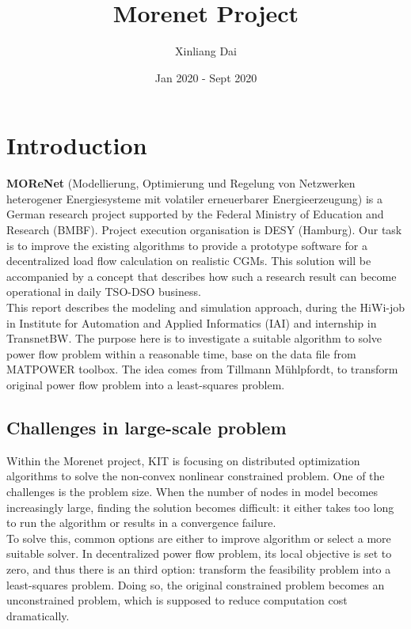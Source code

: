 \documentclass{article}
\title{Morenet Project}
\author{Xinliang Dai}
\date{Jan 2020 - Sept 2020}
\begin{document}
\setlength{\parindent}{0pt}
\maketitle
\tableofcontents
\newpage

\section{Introduction}
\textbf{MOReNet} (Modellierung, Optimierung und Regelung von Netzwerken heterogener Energiesysteme mit volatiler erneuerbarer Energieerzeugung) is a German research project supported by the Federal Ministry of Education and Research (BMBF). Project execution organisation is DESY (Hamburg). Our task is to improve the existing algorithms to provide a prototype software for a decentralized load flow calculation on realistic CGMs. This solution will be accompanied by a concept that describes how such a research result can become operational in daily TSO-DSO business.\\

This report describes the modeling and simulation approach, during the HiWi-job in Institute for Automation and Applied Informatics (IAI) and internship in TransnetBW. The purpose here is to investigate a suitable algorithm to solve power flow problem within a reasonable time, base on the data file from MATPOWER toolbox\citep{matpower}. The idea comes from Tillmann Mühlpfordt, to transform original power flow problem into a least-squares problem.

\subsection{Challenges in large-scale problem}
Within the Morenet project, KIT is focusing on distributed optimization algorithms to solve the non-convex nonlinear constrained problem. One of the challenges is the problem size. When the number of nodes in model becomes increasingly large, finding the solution becomes difficult: it either takes too long to run the algorithm or results in a convergence failure.\\

To solve this, common options are either to improve algorithm or select a more suitable solver. In decentralized power flow problem, its local objective is set to zero, and thus there is an third option: transform the feasibility problem into a least-squares problem. Doing so, the original constrained problem becomes an unconstrained problem, which is supposed to reduce computation cost dramatically.
\end{document}
